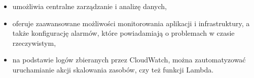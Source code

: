 \documentclass[12pt,twoside]{book}
\begin{document}
\begin{itemize}
\item umożliwia centralne zarządzanie i analizę danych,
\item oferuje zaawansowane możliwości monitorowania aplikacji i infrastruktury, a także konfigurację alarmów, które powiadamiają o problemach w czasie rzeczywistym,
\item na podstawie logów zbieranych przez CloudWatch, można zautomatyzować uruchamianie akcji skalowania zasobów, czy też funkcji Lambda. \cite{aws.cloud.watch}
\end{itemize}



\listoffigures
\end{document}
